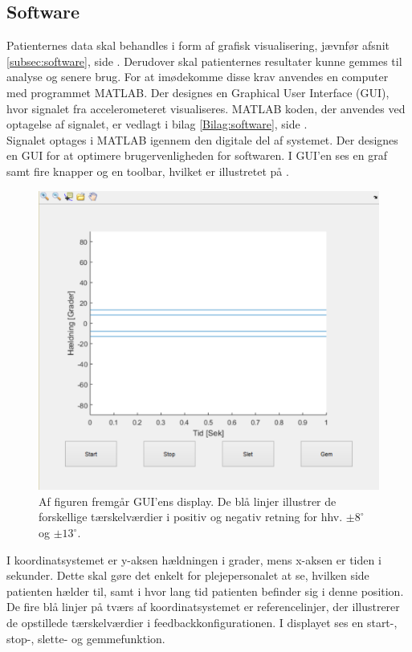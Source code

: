 \subsection{Software}
Patienternes data skal behandles i form af grafisk visualisering, jævnfør afsnit \ref{subsec:software}, side \pageref{subsec:software}. Derudover skal patienternes resultater kunne gemmes til analyse og senere brug. For at imødekomme disse krav anvendes en computer med programmet MATLAB. Der designes en Graphical User Interface (GUI), hvor signalet fra accelerometeret visualiseres. MATLAB koden, der anvendes ved optagelse af signalet, er vedlagt i bilag \ref{Bilag:software}, side \pageref{Bilag:software}.\\ 
Signalet optages i MATLAB igennem den digitale del af systemet. Der designes en GUI for at optimere brugervenligheden for softwaren. I GUI'en ses en graf samt fire knapper og en toolbar, hvilket er illustretet på . 
\begin{figure}[H] 
	\centering 
	\includegraphics[scale=0.5]{figures/cProblemloesning/GUI_generisk.PNG}
	\caption{Af figuren fremgår GUI'ens display. De blå linjer illustrer de forskellige tærskelværdier i positiv og negativ retning for hhv. $\pm 8^{\circ}$ og $\pm 13^{\circ}$.}
	\label{Fig:GUI_generisk}
\end{figure} 
\noindent I koordinatsystemet er y-aksen hældningen i grader, mens x-aksen er tiden i sekunder. Dette skal gøre det enkelt for plejepersonalet at se, hvilken side patienten hælder til, samt i hvor lang tid patienten befinder sig i denne position. De fire blå linjer på tværs af koordinatsystemet er referencelinjer, der illustrerer de opstillede tærskelværdier i feedbackkonfigurationen. I displayet ses en start-, stop-, slette- og gemmefunktion.
